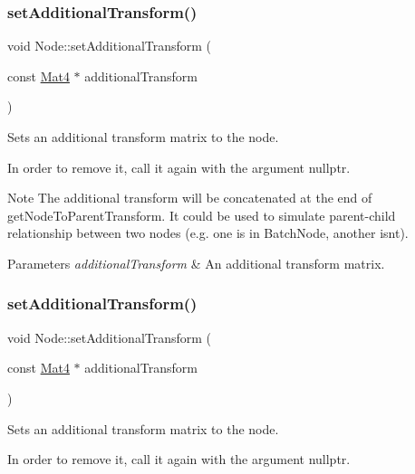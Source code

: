 \subsubsection{\texorpdfstring{set\+Additional\+Transform()}{setAdditionalTransform()}\hspace{0.1cm}{\footnotesize\ttfamily [1/2]}}
{\footnotesize\ttfamily void Node\+::set\+Additional\+Transform (\begin{DoxyParamCaption}\item[{const \hyperlink{classMat4}{Mat4} $\ast$}]{additional\+Transform }\end{DoxyParamCaption})}

Sets an additional transform matrix to the node.

In order to remove it, call it again with the argument {\ttfamily nullptr}.

\begin{DoxyNote}{Note}
The additional transform will be concatenated at the end of get\+Node\+To\+Parent\+Transform. It could be used to simulate {\ttfamily parent-\/child} relationship between two nodes (e.\+g. one is in Batch\+Node, another isn\textquotesingle{}t).
\end{DoxyNote}

\begin{DoxyParams}{Parameters}
{\em additional\+Transform} & An additional transform matrix. \\
\hline
\end{DoxyParams}
\mbox{\label{classNode_a7375e0112b9bf3e5ace5afb32a5cd044}} 
\subsubsection{\texorpdfstring{set\+Additional\+Transform()}{setAdditionalTransform()}\hspace{0.1cm}{\footnotesize\ttfamily [2/2]}}
{\footnotesize\ttfamily void Node\+::set\+Additional\+Transform (\begin{DoxyParamCaption}\item[{const \hyperlink{classMat4}{Mat4} $\ast$}]{additional\+Transform }\end{DoxyParamCaption})}

Sets an additional transform matrix to the node.

In order to remove it, call it again with the argument {\ttfamily nullptr}.

